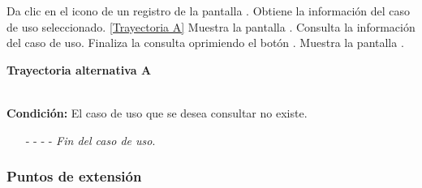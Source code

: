 	\begin{UCtrayectoria}
		\UCpaso[\UCactor] Da clic en el icono  de un registro de la pantalla .
		\UCpaso[\UCsist] Obtiene la información del caso de uso seleccionado. \hyperlink{CU12-4:TAA}{[Trayectoria A]}
		\UCpaso[\UCsist] Muestra la pantalla . \label{CU12.4-P4}
		\UCpaso[\UCactor] Consulta la información del caso de uso.
		\UCpaso[\UCactor] Finaliza la consulta oprimiendo el botón .
		\UCpaso[\UCsist] Muestra la pantalla .
	\end{UCtrayectoria}		
\hypertarget{CU12-4:TAA}{\textbf{Trayectoria alternativa A}}\\
\noindent \textbf{Condición:} El caso de uso que se desea consultar no existe.
\begin{enumerate}
	\UCpaso[\UCsist] Muestra el mensaje  en la pantalla .
	\item[- -] - - {\em {Fin del caso de uso}}.
\end{enumerate}


\subsubsection{Puntos de extensión}

